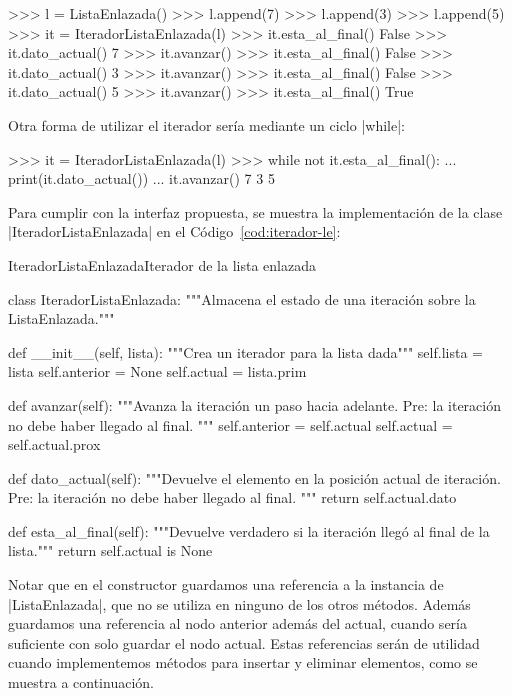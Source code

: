 \begin{codigo-python-sn}
>>> l = ListaEnlazada()
>>> l.append(7)
>>> l.append(3)
>>> l.append(5)
>>> it = IteradorListaEnlazada(l)
>>> it.esta_al_final()
False
>>> it.dato_actual()
7
>>> it.avanzar()
>>> it.esta_al_final()
False
>>> it.dato_actual()
3
>>> it.avanzar()
>>> it.esta_al_final()
False
>>> it.dato_actual()
5
>>> it.avanzar()
>>> it.esta_al_final()
True
\end{codigo-python-sn}

Otra forma de utilizar el iterador sería mediante un ciclo |while|:

\begin{codigo-python-sn}
>>> it = IteradorListaEnlazada(l)
>>> while not it.esta_al_final():
...     print(it.dato_actual())
...     it.avanzar()
7
3
5
\end{codigo-python-sn}

Para cumplir con la interfaz propuesta, se muestra la implementación de la
clase |IteradorListaEnlazada| en el Código~\ref{cod:iterador-le}:

\begin{codigo}{IteradorListaEnlazada}{Iterador de la lista enlazada}
\label{cod:iterador-le}
\begin{codigo-python}
class IteradorListaEnlazada:
    """Almacena el estado de una iteración sobre la ListaEnlazada."""

    def __init__(self, lista):
        """Crea un iterador para la lista dada"""
        self.lista = lista
        self.anterior = None
        self.actual = lista.prim

    def avanzar(self):
        """Avanza la iteración un paso hacia adelante.
        Pre: la iteración no debe haber llegado al final.
        """
        self.anterior = self.actual
        self.actual = self.actual.prox

    def dato_actual(self):
        """Devuelve el elemento en la posición actual de iteración.
        Pre: la iteración no debe haber llegado al final.
        """
        return self.actual.dato

    def esta_al_final(self):
        """Devuelve verdadero si la iteración llegó al final de la lista."""
        return self.actual is None
\end{codigo-python}
\end{codigo}

Notar que en el constructor guardamos una referencia a la instancia de
|ListaEnlazada|, que no se utiliza en ninguno de los otros métodos. Además
guardamos una referencia al nodo anterior además del actual, cuando sería
suficiente con solo guardar el nodo actual.  Estas referencias serán de
utilidad cuando implementemos métodos para insertar y eliminar elementos,
como se muestra a continuación.

